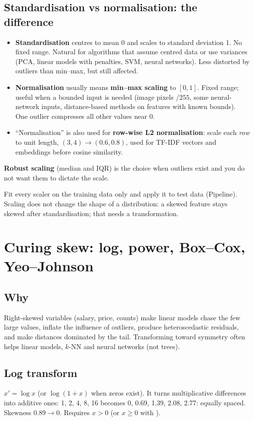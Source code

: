 \subsection{Standardisation vs normalisation: the difference}
\begin{itemize}
\item \textbf{Standardisation} centres to mean 0 and scales to standard deviation 1. No fixed range. Natural for algorithms that assume centred data or use
  variances (PCA, linear models with penalties, SVM, neural networks). Less distorted by outliers than min--max, but still affected.
\item \textbf{Normalisation} usually means \textbf{min--max scaling} to $[0, 1]$. Fixed range; useful when a bounded input is needed (image pixels $/255$, some
  neural-network inputs, distance-based methods on features with known bounds). One outlier compresses all other values near 0.
\item ``Normalisation'' is also used for \textbf{row-wise L2 normalisation}: scale each \emph{row} to unit length, $(3, 4)\to(0.6, 0.8)$, used for TF-IDF vectors
  and embeddings before cosine similarity.
\end{itemize}
\textbf{Robust scaling} (median and IQR) is the choice when outliers exist and you do not want them to dictate the scale.

\begin{trap}
Fit every scaler on the training data only and apply it to test data (Pipeline). Scaling does not change the shape of a distribution: a skewed feature stays
skewed after standardisation; that needs a transformation.
\end{trap}

\section{Curing skew: log, power, Box--Cox, Yeo--Johnson}
\subsection{Why}
Right-skewed variables (salary, price, counts) make linear models chase the few large values, inflate the influence of outliers, produce heteroscedastic
residuals, and make distances dominated by the tail. Transforming toward symmetry often helps linear models, $k$-NN and neural networks (not trees).

\subsection{Log transform}
$x' = \log x$ (or $\log(1 + x)$ when zeros exist). It turns multiplicative differences into additive ones: 1, 2, 4, 8, 16 becomes 0, 0.69, 1.39, 2.08, 2.77: equally
spaced. Skewness $0.89\to0$. Requires $x > 0$ (or $x\ge0$ with ).

